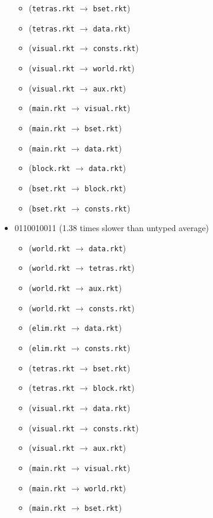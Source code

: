\documentclass{article}
\newcommand{\mono}[1]{\texttt{#1}}
\begin{document}
\begin{itemize}
\begin{itemize}
  \item (\mono{tetras.rkt} $\rightarrow$ \mono{bset.rkt})
  \item (\mono{tetras.rkt} $\rightarrow$ \mono{data.rkt})
  \item (\mono{visual.rkt} $\rightarrow$ \mono{consts.rkt})
  \item (\mono{visual.rkt} $\rightarrow$ \mono{world.rkt})
  \item (\mono{visual.rkt} $\rightarrow$ \mono{aux.rkt})
  \item (\mono{main.rkt} $\rightarrow$ \mono{visual.rkt})
  \item (\mono{main.rkt} $\rightarrow$ \mono{bset.rkt})
  \item (\mono{main.rkt} $\rightarrow$ \mono{data.rkt})
  \item (\mono{block.rkt} $\rightarrow$ \mono{data.rkt})
  \item (\mono{bset.rkt} $\rightarrow$ \mono{block.rkt})
  \item (\mono{bset.rkt} $\rightarrow$ \mono{consts.rkt})
  \end{itemize}
\item 0110010011 (1.38 times slower than untyped average)
  \begin{itemize}
  \item (\mono{world.rkt} $\rightarrow$ \mono{data.rkt})
  \item (\mono{world.rkt} $\rightarrow$ \mono{tetras.rkt})
  \item (\mono{world.rkt} $\rightarrow$ \mono{aux.rkt})
  \item (\mono{world.rkt} $\rightarrow$ \mono{consts.rkt})
  \item (\mono{elim.rkt} $\rightarrow$ \mono{data.rkt})
  \item (\mono{elim.rkt} $\rightarrow$ \mono{consts.rkt})
  \item (\mono{tetras.rkt} $\rightarrow$ \mono{bset.rkt})
  \item (\mono{tetras.rkt} $\rightarrow$ \mono{block.rkt})
  \item (\mono{visual.rkt} $\rightarrow$ \mono{data.rkt})
  \item (\mono{visual.rkt} $\rightarrow$ \mono{consts.rkt})
  \item (\mono{visual.rkt} $\rightarrow$ \mono{aux.rkt})
  \item (\mono{main.rkt} $\rightarrow$ \mono{visual.rkt})
  \item (\mono{main.rkt} $\rightarrow$ \mono{world.rkt})
  \item (\mono{main.rkt} $\rightarrow$ \mono{bset.rkt})

\end{itemize}
\end{itemize}
\end{document}

